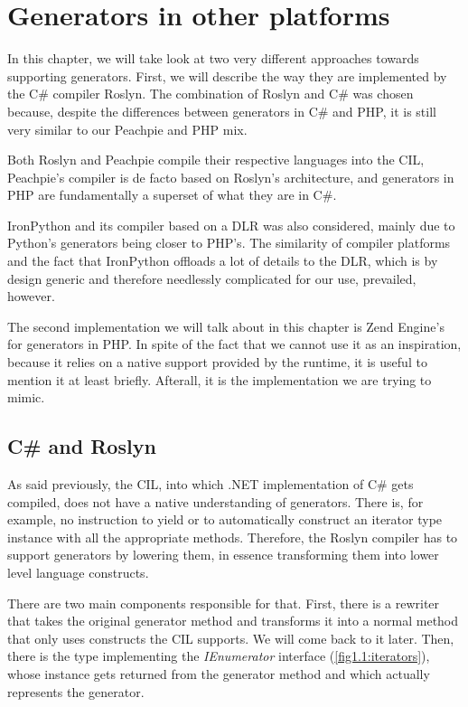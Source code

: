 \chapter{Generators in other platforms}

In this chapter, we will take look at two very different approaches towards supporting generators. First, we will describe the way they are implemented by the C\# compiler Roslyn. The combination of Roslyn and C\# was chosen because, despite the differences between generators in C\# and PHP, it is still very similar to our Peachpie and PHP mix.

Both Roslyn and Peachpie compile their respective languages into the CIL, Peachpie’s compiler is de facto based on Roslyn’s architecture, and generators in PHP are fundamentally a superset of what they are in C\#. 

IronPython and its compiler based on a DLR was also considered, mainly due to Python’s generators being closer to PHP’s. The similarity of compiler platforms and the fact that IronPython offloads a lot of details to the DLR, which is by design generic and therefore needlessly complicated for our use, prevailed, however. 

The second implementation we will talk about in this chapter is Zend Engine’s for generators in PHP. In spite of the fact that we cannot use it as an inspiration, because it relies on a native support provided by the runtime, it is useful to mention it at least briefly. Afterall, it is the implementation we are trying to mimic.

\section{C\# and Roslyn}\label{sec:3:1}

As said previously, the CIL, into which .NET implementation of C\# gets compiled, does not have a native understanding of generators. There is, for example, no instruction to yield or to automatically construct an iterator type instance with all the appropriate methods. Therefore, the Roslyn compiler has to support generators by lowering them, in essence transforming them into lower level language constructs. 

There are two main components responsible for that. First, there is a rewriter that takes the original generator method and transforms it into a normal method that only uses constructs the CIL supports. We will come back to it later. Then, there is the type implementing the \emph{IEnumerator} interface (\autoref{fig1.1:iterators}), whose instance gets returned from the generator method and which actually represents the generator.


